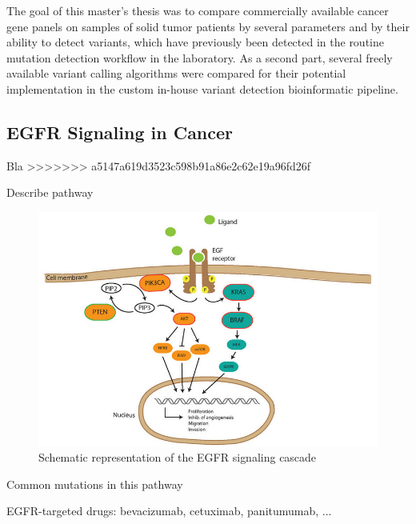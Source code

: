 The goal of this master's thesis was to compare commercially available cancer
gene panels on samples of solid tumor patients by several parameters and by
their ability to detect variants, which have previously been detected in the
routine mutation detection workflow in the laboratory. As a second part, several
freely available variant calling algorithms were compared for their potential
implementation in the custom in-house variant detection bioinformatic pipeline.

\subsection{EGFR Signaling in Cancer}

Bla {\cite{targeting_egfr:2012}}
>>>>>>> a5147a619d3523c598b91a86e2c62e19a96fd26f

Describe pathway

\begin{figure}[ht]
  \begin{center}
    \includegraphics[scale=2,angle=0]{egfr_signaling.png}
    \caption{Schematic representation of the EGFR signaling cascade {\cite{targeting_egfr:2012}}}
    \label{Fig:egfr_signaling}
  \end{center}
\end{figure}

Common mutations in this pathway

EGFR-targeted drugs:
bevacizumab, cetuximab, panitumumab, ...

